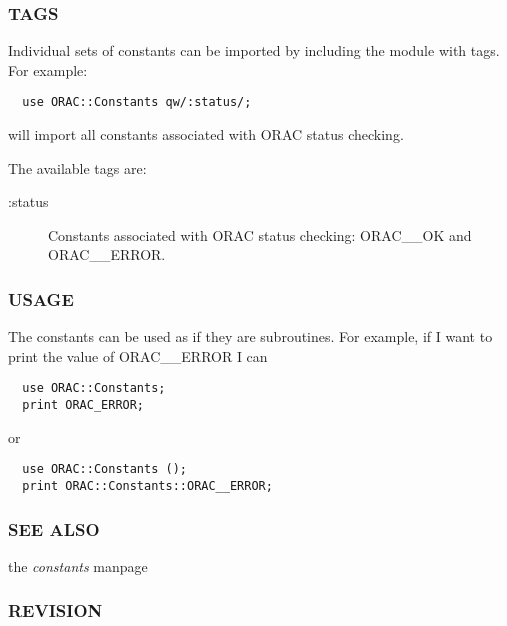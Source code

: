 \subsubsection*{TAGS\label{ORAC::Constants_TAGS}}

Individual sets of constants can be imported by 
including the module with tags. For example:

\begin{verbatim}
  use ORAC::Constants qw/:status/;
\end{verbatim}


will import all constants associated with ORAC status checking.



The available tags are:

\begin{description}
\item[:status] \mbox{}

Constants associated with ORAC status checking: ORAC\_\_OK and ORAC\_\_ERROR.

\end{description}
\subsubsection*{USAGE\label{ORAC::Constants_USAGE}}

The constants can be used as if they are subroutines.
For example, if I want to print the value of ORAC\_\_ERROR I can

\begin{verbatim}
  use ORAC::Constants;
  print ORAC_ERROR;
\end{verbatim}


or

\begin{verbatim}
  use ORAC::Constants ();
  print ORAC::Constants::ORAC__ERROR;
\end{verbatim}
\subsubsection*{SEE ALSO\label{ORAC::Constants_SEE_ALSO}}

the \emph{constants} manpage

\subsubsection*{REVISION\label{ORAC::Constants_REVISION}}

